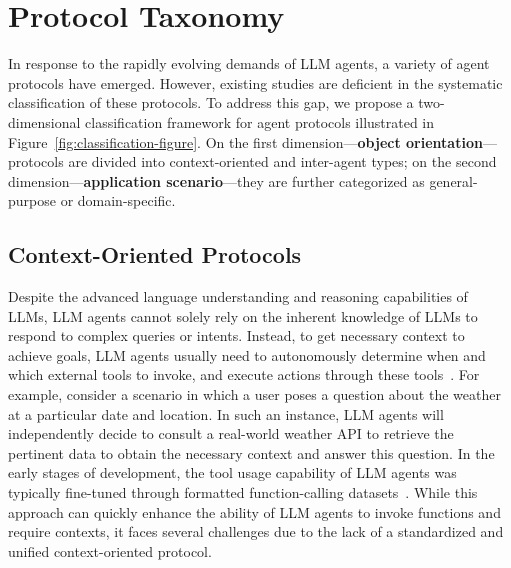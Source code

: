 \documentclass[10pt,preprint]{article}
\begin{document}
\section{Protocol Taxonomy}

In response to the rapidly evolving demands of LLM agents, a variety of agent protocols have emerged. However, existing studies are deficient in the systematic classification of these protocols. To address this gap, we propose a two-dimensional classification framework for agent protocols illustrated in Figure~\ref{fig:classification-figure}. On the first dimension—\textbf{object orientation}—protocols are divided into context-oriented and inter-agent types; on the second dimension—\textbf{application scenario}—they are further categorized as general-purpose or domain-specific.


\subsection{Context-Oriented Protocols}
Despite the advanced language understanding and reasoning capabilities of LLMs, LLM agents cannot solely rely on the inherent knowledge of LLMs to respond to complex queries or intents. Instead, to get necessary context to achieve goals, LLM agents usually need to autonomously determine when and which external tools to invoke, and execute actions through these tools~\citep{liu2025advanceschallengesfoundationagents}. For example, consider a scenario in which a user poses a question about the weather at a particular date and location. In such an instance, LLM agents will independently decide to consult a real-world weather API to retrieve the pertinent data to obtain the necessary context and answer this question. In the early stages of development, the tool usage capability of LLM agents was typically fine-tuned through formatted function-calling datasets~\citep{Qu_2025, schick2023toolformerlanguagemodelsteach, liu2024apigenautomatedpipelinegenerating}. While this approach can quickly enhance the ability of LLM agents to invoke functions and require contexts, it faces several challenges due to the lack of a standardized and unified context-oriented protocol. 
\end{document}
